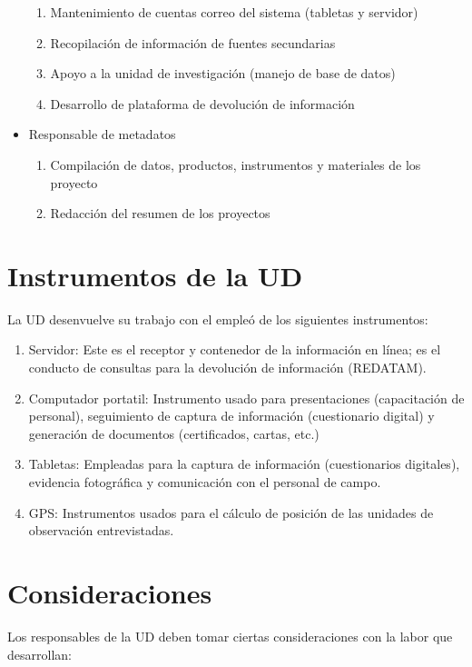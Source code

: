 \documentclass{article}
\begin{document}
\begin{itemize}
\begin{enumerate}
\item Mantenimiento de cuentas correo del sistema (tabletas y servidor)
\item Recopilación de información de fuentes secundarias 
\item Apoyo a la unidad de investigación (manejo de base de datos)
\item Desarrollo de plataforma de devolución de información
\end{enumerate} 
\item Responsable de metadatos
\begin{enumerate}
\item Compilación de datos, productos, instrumentos y materiales de los proyecto
\item Redacción del resumen de los proyectos
\end{enumerate} 
\end{itemize} 



\section{Instrumentos de la UD}

La UD desenvuelve su trabajo con el empleó de los siguientes instrumentos:

\begin{enumerate}
\item Servidor: Este es el receptor y contenedor de la información en línea; es el conducto de consultas para la devolución de información (REDATAM).  
\item Computador portatil: Instrumento usado para presentaciones (capacitación de personal), seguimiento de captura de información (cuestionario digital) y generación de documentos (certificados, cartas, etc.)    
\item Tabletas: Empleadas para la captura de información (cuestionarios digitales), evidencia fotográfica y comunicación con el personal de campo.
\item GPS: Instrumentos usados para el cálculo de posición de las unidades de observación entrevistadas.
\end{enumerate} 

\section{Consideraciones}

Los responsables de la UD deben tomar ciertas consideraciones con la labor que desarrollan:
\end{document}
